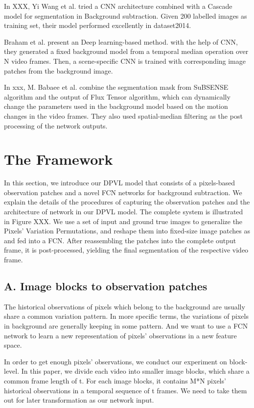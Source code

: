 \documentclass[journal]{IEEEtran}
\begin{document}
In XXX, Yi Wang et al.
tried a CNN architecture combined with a Cascade model for segmentation in Background subtraction.
Given 200 labelled images as training set, their model performed excellently in dataset2014.

Braham et al.
present an Deep learning-based method.
with the help of CNN, they generated a fixed background model from a temporal median operation over N video frames.
Then, a scene-specific CNN is trained with corresponding image patches from the background image.

In xxx, M.
Babaee et al.
combine the segmentation mask from SuBSENSE algorithm and the output of Flux Tensor algorithm, which can dynamically change the parameters used in the background model based on the motion changes in the video frames.
They also used spatial-median filtering as the post processing of the network outputs.



\section{The  Framework}
\label{sec3}
In this section, we introduce our DPVL model that consists of a pixels-based observation patches and a novel FCN networks for background subtraction.
We explain the details of the procedures of capturing the observation patches and the architecture of network in our DPVL model.
The complete system is illustrated in Figure XXX.
We use a set of input and ground true images to generalize the Pixels’ Variation Permutations, and reshape them into fixed-size image patches as and fed into a FCN.
After reassembling the patches into the complete output frame, it is post-processed, yielding the final segmentation of the respective video frame.

\subsection{A. Image blocks to observation  patches}
\label{sec3_fc}
The historical observations of pixels which belong to the background are usually share a common variation pattern.
In more specific terms, the variations of pixels in background are generally keeping in some pattern.
And we want to use a FCN network to learn a new representation of pixels’ observations in a new feature space.
  
In order to get enough pixels’ observations, we conduct our experiment on block-level.
In this paper, we divide each video into smaller image blocks, which share a common frame length of t.
For each image blocks, it contains M*N pixels’ historical observations in a temporal sequence of t frames.
We need to take them out for later transformation as our network input.
\end{document}
